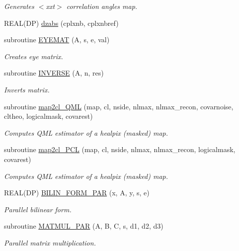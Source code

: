 \begin{DoxyCompactItemize}
\begin{DoxyCompactList}\small\item\em Generates $<$xxt$>$ correlation angles map. \end{DoxyCompactList}\item 
REAL(DP) \hyperlink{namespacef3dex__stats_a70ed2d6cd6c25b9cd95b04e9223e5828}{dzabs} (cplxnb, cplxnbref)
\item 
subroutine \hyperlink{namespacef3dex__stats_ae67784686a6f0a1d26c1cef84c250b0d}{EYEMAT} (A, s, e, val)
\begin{DoxyCompactList}\small\item\em Creates eye matrix. \end{DoxyCompactList}\item 
subroutine \hyperlink{namespacef3dex__stats_a564304481b43b3d55989683f03460410}{INVERSE} (A, n, res)
\begin{DoxyCompactList}\small\item\em Inverts matrix. \end{DoxyCompactList}\item 
subroutine \hyperlink{namespacef3dex__stats_afeef2b0049256649535f458d01e901c8}{map2cl\_\-QML} (map, cl, nside, nlmax, nlmax\_\-recon, covarnoise, cltheo, logicalmask, covarest)
\begin{DoxyCompactList}\small\item\em Computes QML estimator of a healpix (masked) map. \end{DoxyCompactList}\item 
subroutine \hyperlink{namespacef3dex__stats_aeff76c576e1699da5b3aa1f4efa4335d}{map2cl\_\-PCL} (map, cl, nside, nlmax, nlmax\_\-recon, logicalmask, covarest)
\begin{DoxyCompactList}\small\item\em Computes QML estimator of a healpix (masked) map. \end{DoxyCompactList}\item 
REAL(DP) \hyperlink{namespacef3dex__stats_af0a10f88c8029206196ea18b3ad579ba}{BILIN\_\-FORM\_\-PAR} (x, A, y, s, e)
\begin{DoxyCompactList}\small\item\em Parallel bilinear form. \end{DoxyCompactList}\item 
subroutine \hyperlink{namespacef3dex__stats_a046613d05a3a2eb1808a7ee99fba7509}{MATMUL\_\-PAR} (A, B, C, s, d1, d2, d3)
\begin{DoxyCompactList}\small\item\em Parallel matrix multiplication. \end{DoxyCompactList}\item 

\end{DoxyCompactItemize}
